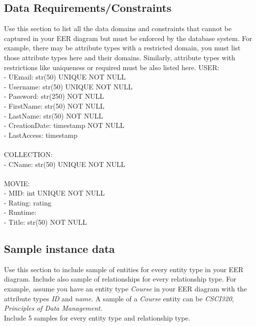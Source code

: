 \documentclass[12pt]{article}
\begin{document}
\subsection{Data Requirements/Constraints}
Use this section to list all the data domains and constraints that cannot be captured in your EER diagram but must be enforced by the database system. For example, there may be attribute types with a restricted domain, you must list those attribute types here and their domains. Similarly, attribute types with restrictions like uniqueness or required must be also listed here.
USER:\\
- UEmail: str(50) UNIQUE NOT NULL\\
- Username: str(50) UNIQUE NOT NULL\\
- Password: str(250) NOT NULL\\
- FirstName: str(50) NOT NULL\\
- LastName: str(50) NOT NULL\\
- CreationDate: timestamp NOT NULL\\
- LastAccess: timestamp\\
\\
COLLECTION:\\
- CName: str(50) UNIQUE NOT NULL\\
\\
MOVIE:\\
- MID: int UNIQUE NOT NULL\\
- Rating: rating\\
- Runtime: \\
- Title: str(50) NOT NULL\\


\subsection{Sample instance data}
Use this section to include sample of entities for every entity type in your EER diagram. Include also sample of relationships for every relationship type. For example, assume you have an entity type \emph{Course} in your EER diagram with the attribute types \emph{ID} and \emph{name}. A sample of a \emph{Course} entity can be \emph{CSCI320, Principles of Data Management}.\\

Include 5 samples for every entity type and relationship type.
\end{document}
